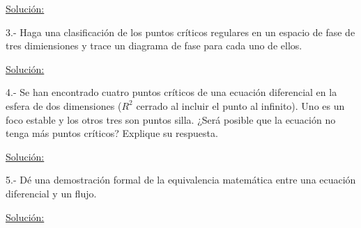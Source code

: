 \documentclass[a4paper,10pt]{article}
\begin{document}
\vspace{.3cm}

\underline{Solución:}

\vspace{.3cm}

3.- Haga una clasificación de los puntos críticos regulares en un espacio de fase 
de tres dimiensiones y trace un diagrama de fase para cada uno de ellos.

\vspace{.3cm}

\underline{Solución:}

\vspace{.3cm}

4.- Se han encontrado cuatro puntos críticos de una ecuación diferencial en la esfera
de dos dimensiones ($R^2$ cerrado al incluir el punto al infinito). Uno es un foco
estable y los otros tres son puntos silla. ¿Será posible que la ecuación no tenga
más puntos críticos? Explique su respuesta.


\vspace{.3cm}

\underline{Solución:}

\vspace{.3cm}

5.- Dé una demostración formal de la equivalencia matemática entre una ecuación
diferencial y un flujo.

\vspace{.3cm}

\underline{Solución:}

\vspace{.3cm}
\end{document}

